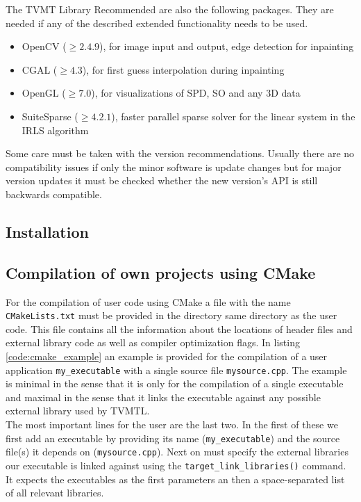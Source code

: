 \begin{chapter}{The TVMT Library}
Recommended are also the following packages. They are needed if any of the described extended functionality needs to be used.
\begin{itemize}
    \item OpenCV ($\geq 2.4.9$), for image input and output, edge detection for inpainting
    \item CGAL ($\geq 4.3$), for first guess interpolation during inpainting
    \item OpenGL ($\geq 7.0$), for visualizations of SPD, SO and any 3D data
    \item SuiteSparse ($\geq 4.2.1$), faster parallel sparse solver for the linear system in the IRLS algorithm
\end{itemize}
Some care must be taken with the version recommendations. Usually there are no compatibility issues if only the minor software is update changes but for major version updates it must
be checked whether the new version's API is still backwards compatible.


\subsection{Installation} %
\label{sub:Installation}


\subsection{Compilation of own projects using CMake} %
\label{sub:CMakeCompilation}
For the compilation of user code using CMake a file with the name \texttt{CMakeLists.txt} must be provided in the directory same directory as the user code. 
This file contains all the information about the locations of header files and external library code as well as compiler optimization flags. In listing \ref{code:cmake_example} 
an example is provided for the compilation of a user application \texttt{my\_executable} with a single source file \texttt{mysource.cpp}. 
The example is minimal in the sense that it is only for the compilation of a single executable and maximal in the sense that it
links the executable against any possible external library used by TVMTL.\\

The most important lines for the user are the last two. In the first of these we first add an executable by providing its name (\texttt{my\_executable}) and the source file(s) it depends on 
(\texttt{mysource.cpp}). Next on must specify the external libraries our executable is linked against using the \texttt{target\_link\_libraries()} command. It expects the executables
as the first parameters an then a space-separated list of all relevant libraries. \\


\end{chapter}
